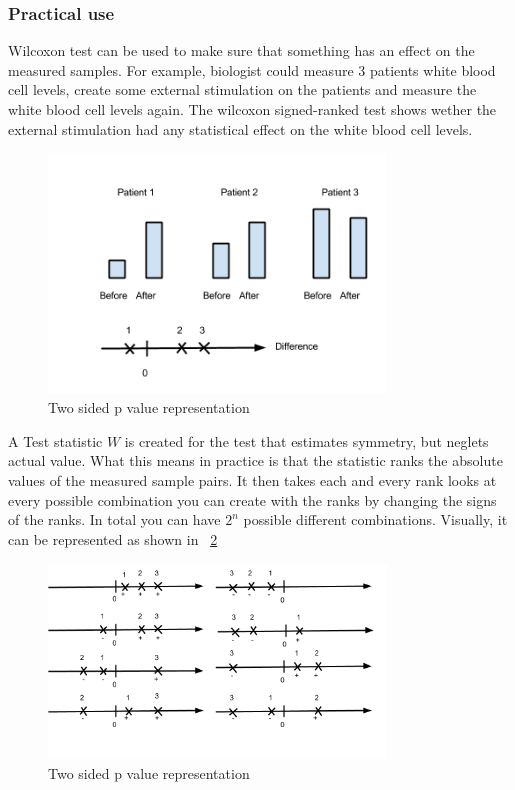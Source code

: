 \documentclass[12pt]{article}
\begin{document}
\subsubsection{Practical use}
Wilcoxon test can be used to make sure that something has an effect on the measured samples. For example, biologist could measure 3 patients white blood cell levels, create some external stimulation on the patients and measure the white blood cell levels again. The wilcoxon signed-ranked test shows wether the external stimulation had any statistical effect on the white blood cell levels.

\begin{figure}[!h]
  \centering
  \includegraphics[width=0.8\textwidth]{patientExample}
  \caption{Two sided p value representation}
  \label{fig:patientExample}
\end{figure}

A Test statistic $W$ is created for the test that estimates symmetry, but neglets actual value. What this means in practice is that the statistic ranks the absolute values of the measured sample pairs. It then takes each and every rank looks at every possible combination you can create with the ranks by changing the signs of the ranks. In total you can have $2^n$ possible different combinations. Visually, it can be represented as shown in ~\ref{fig:rankSignsExample}

\begin{figure}[!h]
  \centering
  \includegraphics[width=0.8\textwidth]{rankSignsExample}
  \caption{Two sided p value representation}
  \label{fig:rankSignsExample}
\end{figure}
\end{document}
